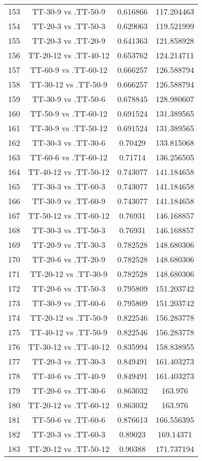\documentclass[a4paper,10pt]{article}
\begin{document}
\begin{landscape}
\begin{table}[!htp]
\begin{tabular}{cccc}
153&TT-30-9 vs .TT-50-9&0.616866&117.204463\\
154&TT-20-3 vs .TT-50-3&0.629063&119.521999\\
155&TT-20-3 vs .TT-20-9&0.641363&121.858928\\
156&TT-20-12 vs .TT-40-12&0.653762&124.214711\\
157&TT-60-9 vs .TT-60-12&0.666257&126.588794\\
158&TT-30-12 vs .TT-50-9&0.666257&126.588794\\
159&TT-30-9 vs .TT-50-6&0.678845&128.980607\\
160&TT-50-9 vs .TT-60-12&0.691524&131.389565\\
161&TT-30-9 vs .TT-50-12&0.691524&131.389565\\
162&TT-30-3 vs .TT-30-6&0.70429&133.815068\\
163&TT-60-6 vs .TT-60-12&0.71714&136.256505\\
164&TT-40-12 vs .TT-50-12&0.743077&141.184658\\
165&TT-30-3 vs .TT-60-3&0.743077&141.184658\\
166&TT-30-9 vs .TT-60-9&0.743077&141.184658\\
167&TT-50-12 vs .TT-60-12&0.76931&146.168857\\
168&TT-30-3 vs .TT-50-3&0.76931&146.168857\\
169&TT-20-9 vs .TT-30-3&0.782528&148.680306\\
170&TT-20-6 vs .TT-20-9&0.782528&148.680306\\
171&TT-20-12 vs .TT-30-9&0.782528&148.680306\\
172&TT-20-6 vs .TT-50-3&0.795809&151.203742\\
173&TT-30-9 vs .TT-60-6&0.795809&151.203742\\
174&TT-20-12 vs .TT-50-9&0.822546&156.283778\\
175&TT-40-12 vs .TT-50-9&0.822546&156.283778\\
176&TT-30-12 vs .TT-40-12&0.835994&158.838955\\
177&TT-20-3 vs .TT-30-3&0.849491&161.403273\\
178&TT-40-6 vs .TT-40-9&0.849491&161.403273\\
179&TT-20-6 vs .TT-30-6&0.863032&163.976\\
180&TT-20-12 vs .TT-60-12&0.863032&163.976\\
181&TT-50-6 vs .TT-60-6&0.876613&166.556395\\
182&TT-20-3 vs .TT-60-3&0.89023&169.14371\\
183&TT-20-12 vs .TT-50-12&0.90388&171.737194\\

\end{tabular}
\end{table}
\end{landscape}
\end{document}
